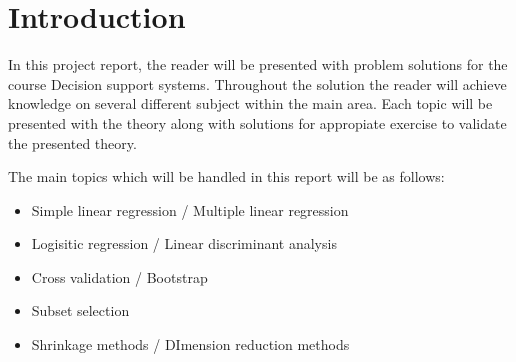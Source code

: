 \graphicspath{{Chapters/Indledning/}}

\chapter{Introduction}

In this project report, the reader will be presented with problem solutions for the course Decision support systems. Throughout the solution the reader will achieve knowledge on several different subject within the main area. Each topic will be presented with the theory along with solutions for appropiate exercise to validate the presented theory. 

The main topics which will be handled in this report will be as follows: 

\begin{itemize}
	\item Simple linear regression / Multiple linear regression
	\item Logisitic regression / Linear discriminant analysis
	\item Cross validation / Bootstrap
	\item Subset selection 
	\item Shrinkage methods / DImension reduction methods 
\end{itemize}